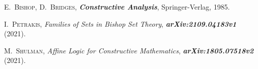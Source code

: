 \documentclass[bsl,meeting]{asl}
\begin{document}
\begin{thebibliography}{10}


% 


{\scshape E.~Bishop, D.~Bridges},
{\bfseries\itshape Constructive Analysis},
Springer-Verlag, 1985.

{\scshape I.~Petrakis},
{\itshape Families of Sets in Bishop Set Theory},
{\bfseries\itshape arXiv:2109.04183v1 }
(2021).

{\scshape M.~Shulman},
{\itshape Affine Logic for Constructive Mathematics},
{\bfseries\itshape arXiv:1805.07518v2}
(2021).

\end{thebibliography}


\vspace*{-0.5\baselineskip}
\end{document}
